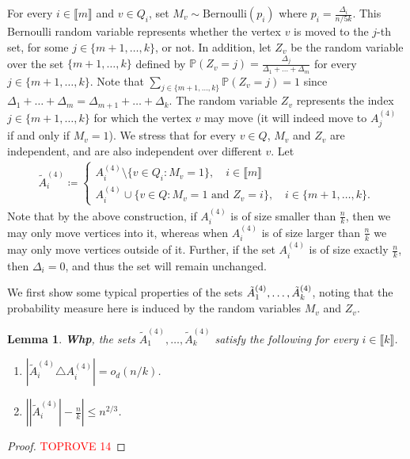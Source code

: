 \documentclass[notitlepage]{scrartcl}
\newcommand{\br}[1]{\llbracket{#1}\rrbracket}
\newtheorem{lemma}[thm]{Lemma}
\renewcommand{\Pr}{\mathbb{P}}
\begin{document}
For every $i \in \br{m}$ and $v \in Q_i$, set $M_v \sim \text{Bernoulli}(p_i)$ where $p_i = \frac{\Delta_i}{n/5k}$. This Bernoulli random variable represents whether the vertex $v$ is moved to the $j$-th set, for some $j \in \{m+1,\ldots, k\}$, or not. In addition, let $Z_v$ be the random variable over the set $\{m+1,\ldots,k\}$ defined by $\Pr(Z_v = j) = \frac{\Delta_j}{\Delta_1 + \ldots  + \Delta_m}$ for every $j \in \{m+1,\ldots, k\}$. Note that $\sum_{j\in\{m+1,\ldots,k\}}\Pr(Z_v=j)=1$ since $\Delta_1+\ldots +  \Delta_m=\Delta_{m+1}+\ldots+\Delta_k$. The random variable $Z_v$ represents the index $j \in \{m+1,\ldots,k\}$ for which the vertex $v$ may move (it will indeed move to $A_j^{(4)}$ if and only if $M_v=1$). We stress that for every $v\in Q$, $M_v$ and $Z_v$ are independent, and are also independent over different $v$. Let
\begin{align*}
    \tilde{A}_i^{(4)} \coloneqq \begin{cases}
        A_i^{(4)} \setminus \{v \in Q_i \colon M_v = 1\}, \quad i \in \br{m} \\
        A_i^{(4)} \cup \{v \in Q \colon M_v = 1 \text{ and } Z_v = i\}, \quad i \in \{m+1,\ldots,k\}.
    \end{cases}
\end{align*}
Note that by the above construction, if $A_i^{(4)}$ is of size smaller than $\frac{n}{k}$, then we may only move vertices into it, whereas when $A_i^{(4)}$ is of size larger than $\frac{n}{k}$ we may only move vertices outside of it. Further, if the set $A_i^{(4)}$ is of size exactly $\frac{n}{k}$, then $\Delta_i=0$, and thus the set will remain unchanged.

We first show some typical properties of the sets $\Tilde{A}_1^{(4)},\ldots, \Tilde{A}_k^{(4)}$, noting that the probability measure here is induced by the random variables $M_v$ and $Z_v$.
\begin{lemma}\label{l: typical aht properties}
\textbf{Whp}, the sets $\tilde{A}_1^{(4)},\ldots, \tilde{A}_k^{(4)}$ satisfy the following for every $i\in \br{k}$.
\begin{enumerate}
    \item $\left|\tilde{A}_i^{(4)}\triangle A_i^{(4)}\right|=o_d(n/k)$.
    \item $\left||\tilde{A}_i^{(4)}|-\frac{n}{k}\right|\le n^{2/3}$.
\end{enumerate}
\end{lemma}
\begin{proof}\textcolor{red}{TOPROVE 14}\end{proof}
\end{document}
